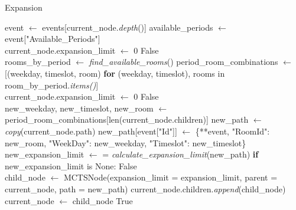 \begin{algorithm}
\caption{Expansion}\label{expansion}
\begin{algorithmic}[1]
    \State event $\gets$ events[current\_node.\textit{depth}()]
    \State available\_periods $\gets$ event["Available\_Periods"]
    \\
        \State current\_node.expansion\_limit $\gets$ 0
        \State \Return False
    \EndIf
    \\
    \State rooms\_by\_period $\gets$ \textit{find\_available\_rooms}()
    \State period\_room\_combinations $\gets$ [(weekday, timeslot, room) \textbf{for} (weekday, timeslot), rooms in room\_by\_period.\textit{items()}]
    \\
        \State current\_node.expansion\_limit $\gets$ 0
        \State \Return False
    \EndIf
    \\
    \State new\_weekday, new\_timeslot, new\_room $\gets$ period\_room\_combinations[len(current\_node.children)]
    \State new\_path $\gets$ \textit{copy}(current\_node.path)
    \State new\_path[event["Id"]] $\gets$ \{**event, "RoomId": new\_room, "WeekDay": new\_weekday, "Timeslot": new\_timeslot\}
    \\
    \State new\_expansion\_limit $\gets$  = \textit{calculate\_expansion\_limit}(new\_path)
    \State \textbf{if} new\_expansion\_limit is None: \Return False
    \\
    \State child\_node $\gets$ MCTSNode(expansion\_limit = expansion\_limit, parent = current\_node, path = new\_path)
    \State current\_node.children.\textit{append}(child\_node)
    \State current\_node $\gets$ child\_node
    \State \Return True
\EndFunction
\end{algorithmic}
\end{algorithm}

